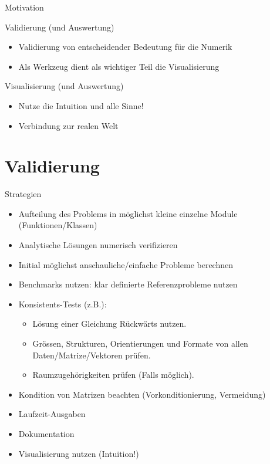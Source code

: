 \documentclass[hyperref={xetex}]{beamer}
\begin{document}
\begin{frame}{Motivation}
  \begin{block}{Validierung (und Auswertung)}
\begin{itemize}
  \item Validierung von entscheidender Bedeutung für die Numerik
  \item Als Werkzeug dient als wichtiger Teil die Visualisierung 
\end{itemize}
  \end{block}
  \begin{block}{Visualisierung (und Auswertung)}
    \begin{itemize}
  \item Nutze die Intuition und alle Sinne!
      \item Verbindung zur realen Welt
    \end{itemize}
  \end{block}
\end{frame}
\section*{Validierung}
\begin{frame}{Strategien}
  \begin{itemize}
    \item Aufteilung des Problems in möglichst kleine einzelne Module (Funktionen/Klassen) 
    \item Analytische Lösungen numerisch verifizieren
    \item Initial möglichst anschauliche/einfache Probleme berechnen
    \item Benchmarks nutzen: klar definierte Referenzprobleme nutzen
    \item Konsistents-Tests (z.B.):
      \begin{itemize}
        \item  Lösung einer Gleichung Rückwärts nutzen. 
        \item Grössen, Strukturen, Orientierungen und Formate von allen Daten/Matrize/Vektoren prüfen.
        \item Raumzugehörigkeiten prüfen (Falls möglich).
      \end{itemize}
    \item Kondition von Matrizen beachten (Vorkonditionierung, Vermeidung)
    \item Laufzeit-Ausgaben
    \item Dokumentation
    \item Visualisierung nutzen (Intuition!)
  \end{itemize}
\end{frame}
\end{document}
